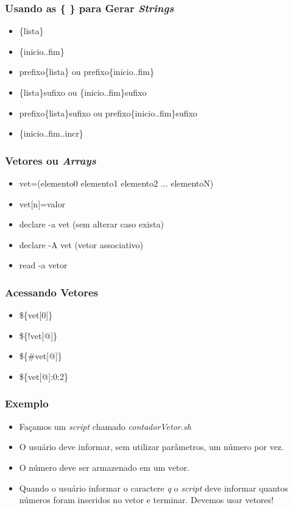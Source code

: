 \documentclass{beamer}
\begin{document}
   \begin{frame}
      \frametitle{Usando as \{ \} para Gerar \textit{Strings}}
      \begin{itemize}
         \item \{lista\}
	      \item \{inicio..fim\}
	      \item prefixo\{lista\} ou prefixo\{inicio..fim\}
	      \item \{lista\}sufixo ou \{inicio..fim\}sufixo
	      \item prefixo\{lista\}sufixo ou prefixo\{inicio..fim\}sufixo
	      \item \{inicio..fim..incr\}
      \end{itemize}
   \end{frame}

   \begin{frame}
      \frametitle{Vetores ou \textit{Arrays}}
      \begin{itemize}
         \item vet=(elemento0 elemento1 elemento2 ... elementoN)
	      \item vet[n]=valor
	      \item declare -a vet (sem alterar caso exista)
	      \item declare -A vet (vetor associativo)
	      \item read -a vetor
      \end{itemize}
   \end{frame}

   \begin{frame}
      \frametitle{Acessando Vetores}
      \begin{itemize}
         \item \$\{vet[0]\}
         \item \$\{!vet[@]\}
	 \item \$\{\#vet[@]\}
	 \item \$\{vet[@]:0:2\}
      \end{itemize}
   \end{frame}
   
   \begin{frame}
      \frametitle{Exemplo}
      \begin{itemize}
        \item Façamos um \textit{script} chamado \textit{contadorVetor.sh} 
	      \item O usuário deve informar, sem utilizar parâmetros, um número por vez.
	      \item O número deve ser armazenado em um vetor. 
	      \item Quando o usuário informar o caractere \textit{q} o \textit{script} deve informar quantos números foram inseridos no vetor e terminar. Devemos usar vetores!
      \end{itemize}
   \end{frame}
\end{document}

